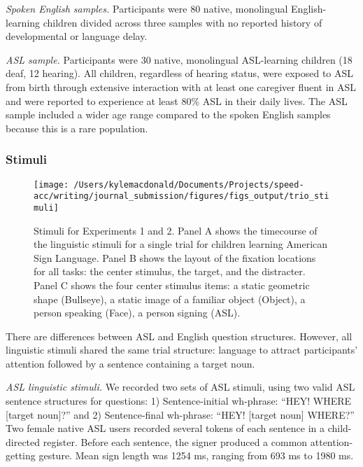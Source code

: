 \documentclass[oneside]{report}
\begin{document}
\emph{Spoken English samples.} Participants were 80 native, monolingual
English-learning children divided across three samples with no reported
history of developmental or language delay.

\emph{ASL sample.} Participants were 30 native, monolingual ASL-learning
children (18 deaf, 12 hearing). All children, regardless of hearing
status, were exposed to ASL from birth through extensive interaction
with at least one caregiver fluent in ASL and were reported to
experience at least 80\% ASL in their daily lives. The ASL sample
included a wider age range compared to the spoken English samples
because this is a rare population.

\subsubsection{Stimuli}\label{stimuli-1}
\begin{figure}[!t]

{\centering \texttt{[image: /Users/kylemacdonald/Documents/Projects/speed-acc/writing/journal\_submission/figures/figs\_output/trio\_stimuli]} 

}

\caption[Stimuli for Experiments 3.1 and 3.2.]{Stimuli for Experiments 1 and 2. Panel A shows the timecourse of the linguistic stimuli for a single trial for children learning American Sign Language. Panel B shows the layout of the fixation locations for all tasks: the center stimulus, the target, and the distracter. Panel C shows the four center stimulus items: a static geometric shape (Bullseye), a static image of a familiar object (Object), a person speaking (Face), a person signing (ASL).}\label{fig:trio-stim}
\end{figure}
There are differences between ASL and English question structures.
However, all linguistic stimuli shared the same trial structure:
language to attract participants' attention followed by a sentence
containing a target noun.

\emph{ASL linguistic stimuli.} We recorded two sets of ASL stimuli,
using two valid ASL sentence structures for questions: 1)
Sentence-initial wh-phrase: ``HEY! WHERE {[}target noun{]}?'' and 2)
Sentence-final wh-phrase: ``HEY! {[}target noun{]} WHERE?'' Two female
native ASL users recorded several tokens of each sentence in a
child-directed register. Before each sentence, the signer produced a
common attention-getting gesture. Mean sign length was 1254 ms, ranging
from 693 ms to 1980 ms.
\end{document}
